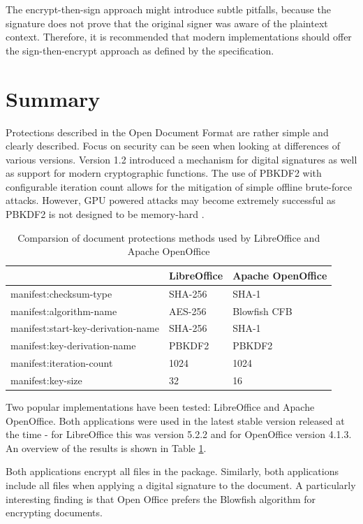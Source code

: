 \documentclass[11pt,oneside]{fithesis2}
\begin{document}
The encrypt-then-sign approach might introduce subtle pitfalls, because the signature does not prove that the original signer was aware of the plaintext context. Therefore, it is recommended that modern implementations should offer the sign-then-encrypt approach as defined by the specification.

\section{Summary}

Protections described in the Open Document Format are rather simple and clearly described. Focus on security can be seen when looking at differences of various versions. Version 1.2 introduced a mechanism for digital signatures as well as support for modern cryptographic functions. The use of PBKDF2 with configurable iteration count allows for the mitigation of simple offline brute-force attacks. However, GPU powered attacks may become extremely successful as PBKDF2 is not designed to be memory-hard \cite{PBKDF2_attack}.

\begin{table}[h]
	\centering
	\begin{tabular}{|l|l|l|}
               \hline
		&\textbf{LibreOffice}&\textbf{Apache OpenOffice}\\
	\hline
		manifest:checksum-type&SHA-256&SHA-1\\
	\hline
		manifest:algorithm-name&AES-256&Blowfish CFB\\
	\hline
		manifest:start-key-derivation-name&SHA-256&SHA-1\\
		manifest:key-derivation-name&PBKDF2&PBKDF2\\
		manifest:iteration-count&1024&1024\\
		manifest:key-size&32&16\\
	\hline
           \end{tabular}
	\caption{Comparsion of document protections methods used by LibreOffice and Apache OpenOffice}
	\label{odt_impl_results}
\end{table}

Two popular implementations have been tested: LibreOffice and Apache OpenOffice. Both applications were used in the latest stable version released at the time - for LibreOffice this was version 5.2.2 and for OpenOffice version 4.1.3. An overview of the results is shown in Table \ref{odt_impl_results}.

Both applications encrypt all files in the package. Similarly, both applications include all files when applying a digital signature to the document. A particularly interesting finding is that Open Office prefers the Blowfish algorithm for encrypting documents.
\end{document}
